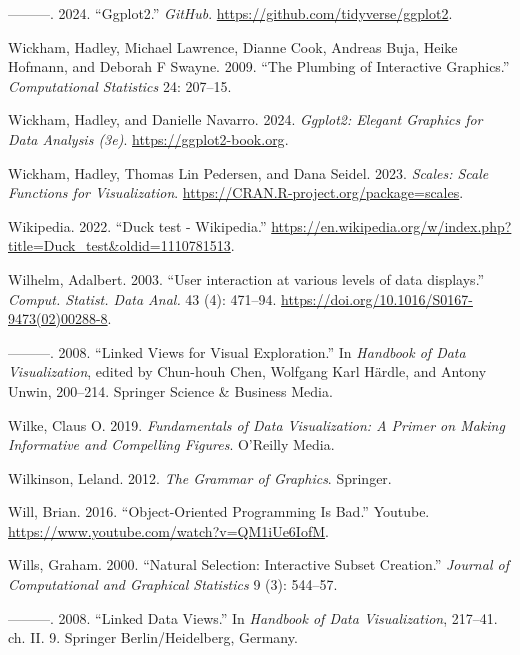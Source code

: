 \documentclass[
  openany]{book}
\newlength{\cslhangindent}
\newenvironment{CSLReferences}[2] %
 {\begin{list}{}{%
  \setlength{\itemindent}{0pt}
  \setlength{\leftmargin}{0pt}
  \setlength{\parsep}{0pt}
  \ifodd #1
   \setlength{\leftmargin}{\cslhangindent}
   \setlength{\itemindent}{-1\cslhangindent}
  \fi
  \setlength{\itemsep}{#2\baselineskip}}}
 {\end{list}}
\theoremstyle{definition}
\theoremstyle{definition}
\theoremstyle{definition}
\theoremstyle{definition}
\theoremstyle{remark}
\begin{document}
\begin{CSLReferences}{1}{0}
---------. 2024. {``Ggplot2.''} \emph{GitHub}. \url{https://github.com/tidyverse/ggplot2}.

Wickham, Hadley, Michael Lawrence, Dianne Cook, Andreas Buja, Heike Hofmann, and Deborah F Swayne. 2009. {``The Plumbing of Interactive Graphics.''} \emph{Computational Statistics} 24: 207--15.

Wickham, Hadley, and Danielle Navarro. 2024. \emph{Ggplot2: Elegant Graphics for Data Analysis (3e)}. \url{https://ggplot2-book.org}.

Wickham, Hadley, Thomas Lin Pedersen, and Dana Seidel. 2023. \emph{Scales: Scale Functions for Visualization}. \url{https://CRAN.R-project.org/package=scales}.

Wikipedia. 2022. {``{Duck test - Wikipedia}.''} \url{https://en.wikipedia.org/w/index.php?title=Duck_test&oldid=1110781513}.

Wilhelm, Adalbert. 2003. {``{User interaction at various levels of data displays}.''} \emph{Comput. Statist. Data Anal.} 43 (4): 471--94. \url{https://doi.org/10.1016/S0167-9473(02)00288-8}.

---------. 2008. {``Linked Views for Visual Exploration.''} In \emph{Handbook of Data Visualization}, edited by Chun-houh Chen, Wolfgang Karl Härdle, and Antony Unwin, 200--214. Springer Science \& Business Media.

Wilke, Claus O. 2019. \emph{Fundamentals of Data Visualization: A Primer on Making Informative and Compelling Figures}. O'Reilly Media.

Wilkinson, Leland. 2012. \emph{The Grammar of Graphics}. Springer.

Will, Brian. 2016. {``Object-Oriented Programming Is Bad.''} Youtube. \url{https://www.youtube.com/watch?v=QM1iUe6IofM}.

Wills, Graham. 2000. {``Natural Selection: Interactive Subset Creation.''} \emph{Journal of Computational and Graphical Statistics} 9 (3): 544--57.

---------. 2008. {``Linked Data Views.''} In \emph{Handbook of Data Visualization}, 217--41. ch. II. 9. Springer Berlin/Heidelberg, Germany.


\end{CSLReferences}
\end{document}
